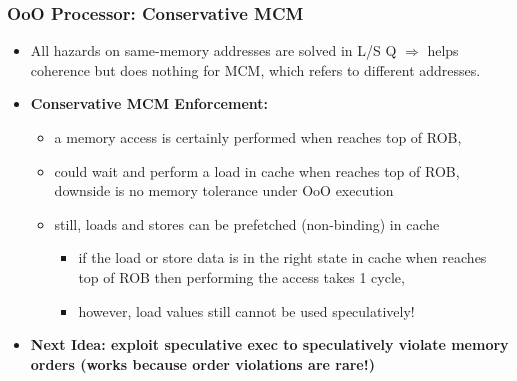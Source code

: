 \documentclass{beamer}
\newcommand{\emp}[1]{\textcolor{DikuRed}{ #1}}
\newcommand{\emphh}[1]{\textcolor{CosGreen}{ #1}}
\begin{document}
\begin{frame}[fragile,t]
\frametitle{OoO Processor: Conservative MCM}

\begin{itemize}
\item All hazards on same-memory addresses are solved in L/S Q $\Rightarrow$ 
            helps coherence but does nothing for MCM, 
            which refers to different addresses.\medskip
\item \emp{\bf Conservative MCM Enforcement:} 
    \begin{itemize}
        \item a memory access is certainly performed when reaches top of ROB,\medskip
        \item could wait and perform a load in cache when reaches top of ROB,\\
                \alert{downside is no memory tolerance under OoO execution} \medskip
        \item still, loads and stores can be prefetched (non-binding) in cache
            \begin{itemize}
                \item if the load or store data is in the right state
                        in cache when reaches top of ROB then performing
                        the access takes 1 cycle,
                \item however, \alert{load values still cannot be used speculatively!}
            \end{itemize} 
    \end{itemize}\medskip
\item \emphh{\bf Next Idea: exploit speculative exec to speculatively violate memory orders (works because order violations are rare!)}
\end{itemize}
\end{frame}
\end{document}
